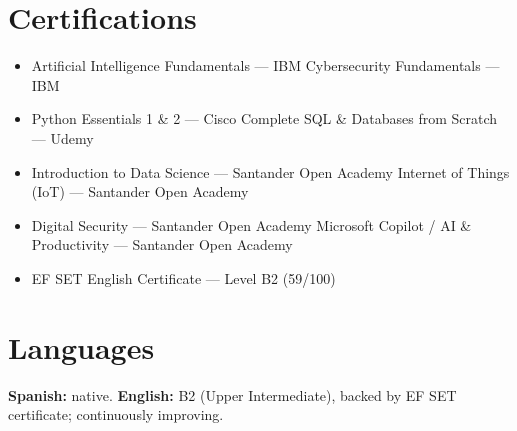 \documentclass[11pt,a4paper]{article}
\begin{document}
\section{Certifications}
\begin{itemize}[itemsep=1pt]
  \item Artificial Intelligence Fundamentals --- IBM \hfill\textbullet\hfill Cybersecurity Fundamentals --- IBM
  \item Python Essentials 1 \& 2 --- Cisco \hfill\textbullet\hfill Complete SQL \& Databases from Scratch --- Udemy
  \item Introduction to Data Science --- Santander Open Academy \hfill\textbullet\hfill Internet of Things (IoT) --- Santander Open Academy
  \item Digital Security --- Santander Open Academy \hfill\textbullet\hfill Microsoft Copilot / AI \& Productivity --- Santander Open Academy
  \item EF SET English Certificate --- Level B2 (59/100)
\end{itemize}

\section{Languages}
\textbf{Spanish:} native. \qquad \textbf{English:} B2 (Upper Intermediate), backed by EF SET certificate; continuously improving.
\end{document}
